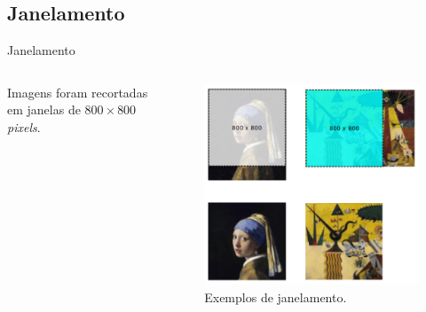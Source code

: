 \documentclass{beamer}
\begin{document}
\subsection{Janelamento}
\begin{frame}{Janelamento}

\begin{columns}
 \begin{column}{.49\textwidth}
 Imagens foram recortadas em janelas de $800 \times 800$ \textit{pixels}.
 \end{column}

 \begin{column}{.49\textwidth}

\begin{figure}[h!]
\begin{center}
  \includegraphics[width=\columnwidth]{figs/passos_janelamento2}
        \caption{Exemplos de janelamento.}
        \label{fig:janelamento}
\end{center}
\end{figure}

\end{column}
\end{columns}

\end{frame}
\end{document}
